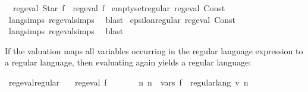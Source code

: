 \begin{isabellebody}
\ \ {\isachardoublequoteopen}reg{\isacharunderscore}{\kern0pt}eval\ {\isacharparenleft}{\kern0pt}Star\ f{\isacharparenright}{\kern0pt}\ {\isasymlongleftrightarrow}\ reg{\isacharunderscore}{\kern0pt}eval\ f{\isachardoublequoteclose}\isanewline
\isanewline
\isanewline
{}\isamarkupfalse%
\ emptyset{\isacharunderscore}{\kern0pt}regular{\isacharcolon}{\kern0pt}\ {\isachardoublequoteopen}reg{\isacharunderscore}{\kern0pt}eval\ {\isacharparenleft}{\kern0pt}Const\ {\isacharbraceleft}{\kern0pt}{\isacharbraceright}{\kern0pt}{\isacharparenright}{\kern0pt}{\isachardoublequoteclose}\isanewline
%
\isadelimproof
\ \ %
\endisadelimproof
%
\isatagproof
{}\isamarkupfalse%
\ lang{\isachardot}{\kern0pt}simps{\isacharparenleft}{\kern0pt}{}{\isacharparenright}{\kern0pt}\ reg{\isacharunderscore}{\kern0pt}eval{\isachardot}{\kern0pt}simps{\isacharparenleft}{\kern0pt}{}{\isacharparenright}{\kern0pt}\ \isamarkupfalse%
\ blast%
\endisatagproof
{\isafoldproof}%
%
\isadelimproof
\isanewline
%
\endisadelimproof
\isanewline
{}\isamarkupfalse%
\ epsilon{\isacharunderscore}{\kern0pt}regular{\isacharcolon}{\kern0pt}\ {\isachardoublequoteopen}reg{\isacharunderscore}{\kern0pt}eval\ {\isacharparenleft}{\kern0pt}Const\ {\isacharbraceleft}{\kern0pt}{\isacharbrackleft}{\kern0pt}{\isacharbrackright}{\kern0pt}{\isacharbraceright}{\kern0pt}{\isacharparenright}{\kern0pt}{\isachardoublequoteclose}\isanewline
%
\isadelimproof
\ \ %
\endisadelimproof
%
\isatagproof
{}\isamarkupfalse%
\ lang{\isachardot}{\kern0pt}simps{\isacharparenleft}{\kern0pt}{}{\isacharparenright}{\kern0pt}\ reg{\isacharunderscore}{\kern0pt}eval{\isachardot}{\kern0pt}simps{\isacharparenleft}{\kern0pt}{}{\isacharparenright}{\kern0pt}\ \isamarkupfalse%
\ blast%
\endisatagproof
{\isafoldproof}%
%
\isadelimproof
%
\endisadelimproof
%
\begin{isamarkuptext}%
If the valuation  maps all variables occurring in the regular language expression  to
a regular language, then evaluating  again yields a regular language:%
\end{isamarkuptext}\isamarkuptrue%
\isamarkupfalse%
\ reg{\isacharunderscore}{\kern0pt}eval{\isacharunderscore}{\kern0pt}regular{\isacharcolon}{\kern0pt}\isanewline
\ \ \ {\isachardoublequoteopen}reg{\isacharunderscore}{\kern0pt}eval\ f{\isachardoublequoteclose}\isanewline
\ \ \ \ \ \ \ {\isachardoublequoteopen}{\isasymAnd}n{\isachardot}{\kern0pt}\ n\ {\isasymin}\ vars\ f\ {\isasymLongrightarrow}\ regular{\isacharunderscore}{\kern0pt}lang\ {\isacharparenleft}{\kern0pt}v\ n{\isacharparenright}{\kern0pt}{\isachardoublequoteclose}\isanewline

\end{isabellebody}
